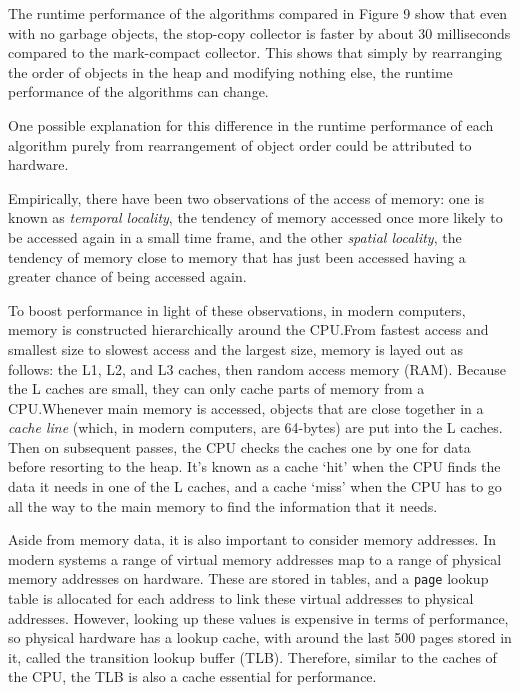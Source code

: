 \documentclass[index]{subfiles}
\begin{document}
The runtime performance of the algorithms compared in Figure 9 show that even with no garbage objects, the stop-copy collector is faster by about 30 milliseconds compared to the mark-compact collector. This shows that simply by rearranging the order of objects in the heap and modifying nothing else, the runtime performance of the algorithms can change.

One possible explanation for this difference in the runtime performance of each algorithm purely from rearrangement of object order could be attributed to hardware.

Empirically, there have been two observations of the access of memory: one is known as \textit{temporal locality}, the tendency of memory accessed once more likely to be accessed again in a small time frame, and the other \textit{spatial locality}, the tendency of memory close to memory that has just been accessed having a greater chance of being accessed again\cite[18:21]{oracledevelopersCachingUnderstandMeasure2015}.

To boost performance in light of these observations, in modern computers, memory is constructed hierarchically\cite{simondevCanJavaScriptGo2021} around the CPU.\@ From fastest access and smallest size to slowest access and the largest size, memory is layed out as follows: the L1, L2, and L3 caches, then random access memory (RAM)\cite{simondevCanJavaScriptGo2021}. Because the L caches are small, they can only cache parts of memory from a CPU.\@ Whenever main memory is accessed, objects that are close together in a \textit{cache line} (which, in modern computers, are 64-bytes) are put into the L caches\cites{simondevCanJavaScriptGo2021}{code_project}. Then on subsequent passes, the CPU checks the caches one by one for data before resorting to the heap. It's known as a cache `hit' when the CPU finds the data it needs in one of the L caches, and a cache `miss'\cite{simondevCanJavaScriptGo2021} when the CPU has to go all the way to the main memory to find the information that it needs.

Aside from memory data, it is also important to consider memory addresses. In modern systems a range of virtual memory addresses map to a range of physical memory addresses on hardware\cites{code_project}[31:29]{oracledevelopersCachingUnderstandMeasure2015}. These are stored in tables, and a \verb+page+ lookup table is allocated for each address to link these virtual addresses to physical addresses. However, looking up these values is expensive in terms of performance, so physical hardware has a lookup cache, with around the last 500 pages stored in it, called the transition lookup buffer (TLB)\cites{code_project}[32:42]{oracledevelopersCachingUnderstandMeasure2015}. Therefore, similar to the caches of the CPU, the TLB is also a cache essential for performance.
\end{document}
